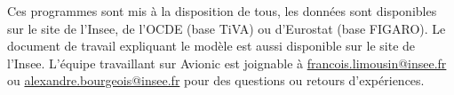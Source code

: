 \documentclass[a4paper,french,11pt]{article}
\begin{document}
Ces programmes sont mis \`a la disposition de tous, les donn\'ees sont disponibles sur le site de l'Insee, de l'OCDE (base TiVA) ou d'Eurostat (base FIGARO). Le document de travail expliquant le mod\`ele est aussi disponible sur le site de l'Insee. L'\'equipe travaillant sur Avionic est joignable \`a \href{mailto:francois.limousin@insee.fr}{francois.limousin@insee.fr} ou \href{mailto:alexandre.bourgeois@insee.fr}{alexandre.bourgeois@insee.fr} pour des questions ou retours d'exp\'eriences.
\end{document}
